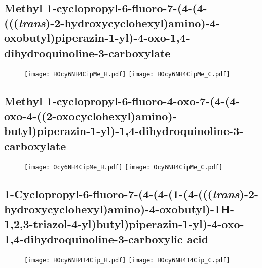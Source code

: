 \subsection{Methyl 1\hyp{}cyclopropyl\hyp{}6\hyp{}fluoro\hyp{}7\hyp{}(4\hyp{}(4\hyp{}(((\textit{trans})\hyp{}2\hyp{}hydroxycyclohexyl)amino)\hyp{}4\hyp{}oxobutyl)piperazin\hyp{}1\hyp{}yl)\hyp{}4\hyp{}oxo\hyp{}1,4\hyp{}dihydroquinoline\hyp{}3\hyp{}carboxylate }

\begin{figure}[H]
	\centering
		\texttt{[image: HOcy6NH4CipMe\_H.pdf]}
		\texttt{[image: HOcy6NH4CipMe\_C.pdf]}
\end{figure}

\subsection{Methyl 1\hyp{}cyclopropyl\hyp{}6\hyp{}fluoro\hyp{}4\hyp{}oxo\hyp{}7\hyp{}(4\hyp{}(4\hyp{}oxo\hyp{}4\hyp{}((2\hyp{}oxocyclohexyl)amino)\hyp{}butyl)piperazin\hyp{}1\hyp{}yl)\hyp{}1,4\hyp{}dihydroquinoline\hyp{}3\hyp{}carboxylate }

\begin{figure}[H]
	\centering
		\texttt{[image: Ocy6NH4CipMe\_H.pdf]}
		\texttt{[image: Ocy6NH4CipMe\_C.pdf]}
\end{figure}

\subsection{1\hyp{}Cyclopropyl\hyp{}6\hyp{}fluoro\hyp{}7\hyp{}(4\hyp{}(4\hyp{}(1\hyp{}(4\hyp{}(((\textit{trans})\hyp{}2\hyp{}hydroxycyclohexyl)amino)\hyp{}4\hyp{}oxobutyl)\hyp{}1H\hyp{}1,2,3\hyp{}triazol\hyp{}4\hyp{}yl)butyl)piperazin\hyp{}1\hyp{}yl)\hyp{}4\hyp{}oxo\hyp{}1,4\hyp{}dihydroquinoline\hyp{}3\hyp{}carboxylic acid }

\begin{figure}[H]
	\centering
		\texttt{[image: HOcy6NH4T4Cip\_H.pdf]}
		\texttt{[image: HOcy6NH4T4Cip\_C.pdf]}
\end{figure}


